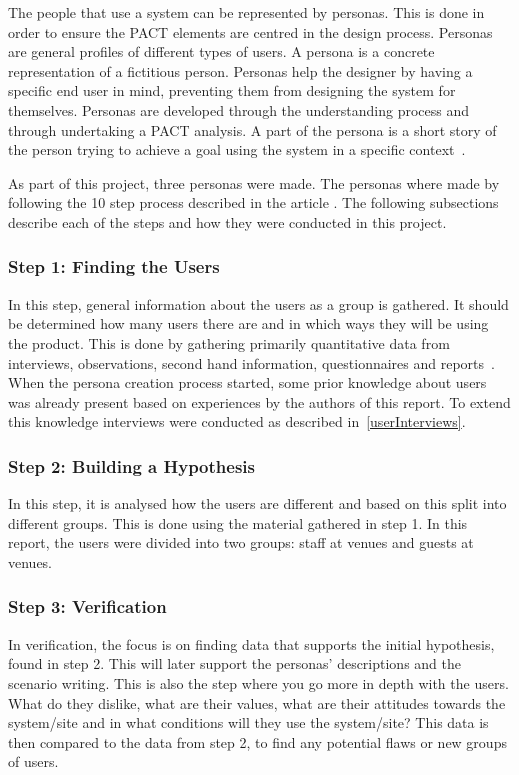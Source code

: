 The people that use a system can be represented by personas. This is done in order to ensure the PACT elements are centred in the design process. Personas are general profiles of different types of users. A persona is a concrete representation of a fictitious person. Personas help the designer by having a specific end user in mind, preventing them from designing the system for themselves. Personas are developed through the understanding process and through undertaking a PACT analysis. A part of the persona is a short story of the person trying to achieve a goal using the system in a specific context~\cite{benyon2013designing}.

As part of this project, three personas were made. The personas where
made by following the 10 step process described in the article . The following subsections describe each of the steps and how they were conducted in this project.

\subsubsection{Step 1: Finding the Users}
In this step, general information about the users as a group is gathered. It should be determined how many users there are and in which ways they will be using the product. This is done by gathering primarily quantitative data from interviews, observations, second hand information, questionnaires and reports~\cite{nielsen2007ten}. When the persona creation process started, some prior knowledge about users was already present based on experiences by the authors of this report. To extend this knowledge interviews were conducted as described in~\cref{userInterviews}.

\subsubsection{Step 2: Building a Hypothesis}
In this step, it is analysed how the users are different and based on this split into different groups. This is done using the material gathered in step 1. In this report, the users were divided into two groups: staff at venues and guests at venues.

\subsubsection{Step 3: Verification}
In verification, the focus is on finding data that supports the initial hypothesis, found in step 2. This will later support the personas' descriptions and the scenario writing. This is also the step where you go more in depth with the users. What do they dislike, what are their values, what are their attitudes towards the system/site and in what conditions will they use the system/site? This data is then compared to the data from step 2, to find any potential flaws or new groups of users.

